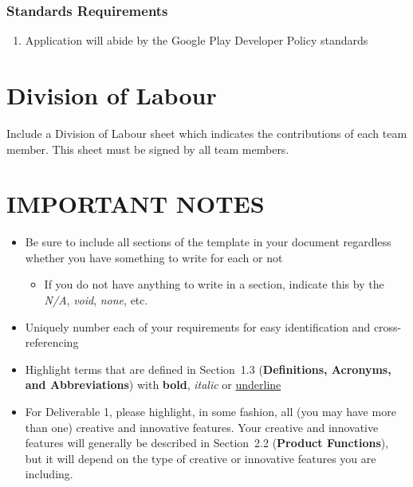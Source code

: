 \documentclass[]{article}
\begin{document}
\subsubsection{Standards Requirements}
\label{ssub:standards_requirements}
\begin{enumerate}[{LR}1. ]
	\item Application will abide by the Google Play Developer Policy standards
\end{enumerate}



\appendix
\section{Division of Labour}
\label{sec:division_of_labour}
Include a Division of Labour sheet which indicates the contributions of each team member. This sheet must be signed by all team members.

\newpage
\section*{IMPORTANT NOTES}
\begin{itemize}
	\item Be sure to include all sections of the template in your document regardless whether you have something to write for each or not
	\begin{itemize}
		\item If you do not have anything to write in a section, indicate this by the \emph{N/A}, \emph{void}, \emph{none}, etc.
	\end{itemize}
	\item Uniquely number each of your requirements for easy identification and cross-referencing
	\item Highlight terms that are defined in Section~1.3 (\textbf{Definitions, Acronyms, and Abbreviations}) with \textbf{bold}, \emph{italic} or \underline{underline}
	\item For Deliverable 1, please highlight, in some fashion, all (you may have more than one) creative and innovative features. Your creative and innovative features will generally be described in Section~2.2 (\textbf{Product Functions}), but it will depend on the type of creative or innovative features you are including.
\end{itemize}
\end{document}
